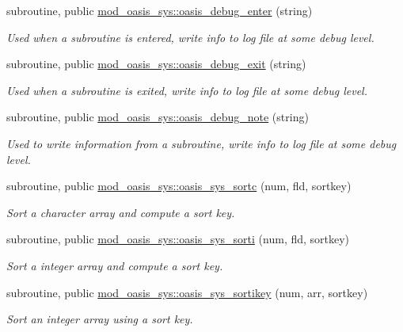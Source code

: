 \begin{DoxyCompactItemize}
subroutine, public \hyperlink{namespacemod__oasis__sys_ab963e928a34a1521ec2c1921cc956cc5}{mod\+\_\+oasis\+\_\+sys\+::oasis\+\_\+debug\+\_\+enter} (string)
\begin{DoxyCompactList}\small\item\em Used when a subroutine is entered, write info to log file at some debug level. \end{DoxyCompactList}\item 
subroutine, public \hyperlink{namespacemod__oasis__sys_a349f71cba2df935179d78f3858992c83}{mod\+\_\+oasis\+\_\+sys\+::oasis\+\_\+debug\+\_\+exit} (string)
\begin{DoxyCompactList}\small\item\em Used when a subroutine is exited, write info to log file at some debug level. \end{DoxyCompactList}\item 
subroutine, public \hyperlink{namespacemod__oasis__sys_a8e488f6a9a829762324519c6dd493912}{mod\+\_\+oasis\+\_\+sys\+::oasis\+\_\+debug\+\_\+note} (string)
\begin{DoxyCompactList}\small\item\em Used to write information from a subroutine, write info to log file at some debug level. \end{DoxyCompactList}\item 
subroutine, public \hyperlink{namespacemod__oasis__sys_ab2aa592727d1e5bea728281679d5ca8d}{mod\+\_\+oasis\+\_\+sys\+::oasis\+\_\+sys\+\_\+sortc} (num, fld, sortkey)
\begin{DoxyCompactList}\small\item\em Sort a character array and compute a sort key. \end{DoxyCompactList}\item 
subroutine, public \hyperlink{namespacemod__oasis__sys_a0deb9712f58a255d6ae938af2ed8b35c}{mod\+\_\+oasis\+\_\+sys\+::oasis\+\_\+sys\+\_\+sorti} (num, fld, sortkey)
\begin{DoxyCompactList}\small\item\em Sort a integer array and compute a sort key. \end{DoxyCompactList}\item 
subroutine, public \hyperlink{namespacemod__oasis__sys_ae73e75ed1a8aaba9da01d79ad3276e13}{mod\+\_\+oasis\+\_\+sys\+::oasis\+\_\+sys\+\_\+sortikey} (num, arr, sortkey)
\begin{DoxyCompactList}\small\item\em Sort an integer array using a sort key. \end{DoxyCompactList}\item 

\end{DoxyCompactItemize}
